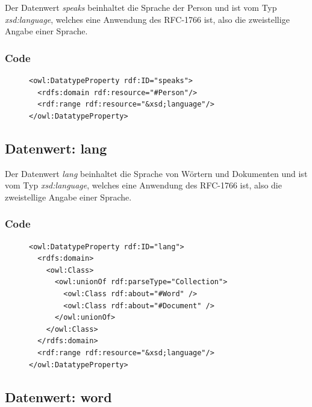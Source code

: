 \documentclass[
    11pt,
    latin1,
    a4paper,
    oneside
]{scrreprt}
\begin{document}
Der Datenwert \emph{speaks} beinhaltet die Sprache der Person und ist vom Typ \emph{xsd:language}, welches eine Anwendung des RFC-1766 ist, also die zweistellige Angabe einer Sprache.

\subsubsection{Code} \label{sec:data_speaks_code}

\begin{figure}[H]
 \lstset{language=XML}
 \begin{lstlisting}[label=owl:speaks,caption={Der Datenwert \emph{speaks} gibt die Sprache einer Person an.}]
<owl:DatatypeProperty rdf:ID="speaks">
  <rdfs:domain rdf:resource="#Person"/>
  <rdf:range rdf:resource="&xsd;language"/>
</owl:DatatypeProperty>
 \end{lstlisting}
\end{figure}


\subsection{Datenwert: lang} \label{sec:data_lang}

Der Datenwert \emph{lang} beinhaltet die Sprache von W\"ortern und Dokumenten und ist vom Typ \emph{xsd:language}, welches eine Anwendung des RFC-1766 ist, also die zweistellige Angabe einer Sprache.

\subsubsection{Code} \label{sec:data_lang_code}

\begin{figure}[H]
 \lstset{language=XML}
 \begin{lstlisting}[label=owl:lang,caption={Der Datenwert \emph{lang} gibt die Sprache eines Wortes oder Dokumentes an.}]
<owl:DatatypeProperty rdf:ID="lang">
  <rdfs:domain>
    <owl:Class>
      <owl:unionOf rdf:parseType="Collection">
        <owl:Class rdf:about="#Word" />
        <owl:Class rdf:about="#Document" />
      </owl:unionOf>
    </owl:Class>
  </rdfs:domain>
  <rdf:range rdf:resource="&xsd;language"/>
</owl:DatatypeProperty>
 \end{lstlisting}
\end{figure}


\subsection{Datenwert: word} \label{sec:data_word}
\end{document}
